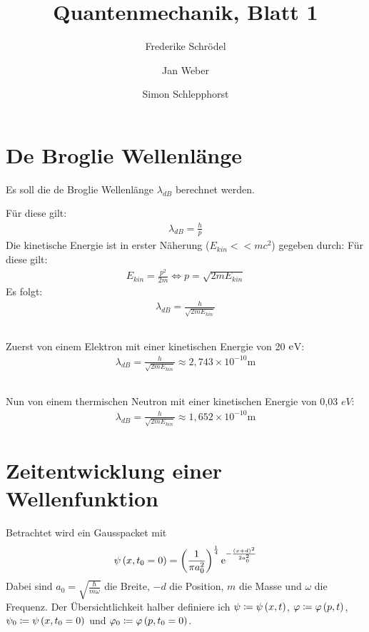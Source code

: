 \documentclass[11pt, ngerman, fleqn, DIV=15, headinclude]{scrartcl}
\title{Quantenmechanik, Blatt 1}
\author{
    Frederike Schrödel \and Jan Weber \and Simon Schlepphorst
}
\begin{document}
\maketitle

\section{De Broglie Wellenlänge}

Es soll die de Broglie Wellenlänge $\lambda_{dB}$ berechnet werden.

Für diese gilt:
\begin{align*}
	\lambda_{dB}=\frac{h}{p}
\end{align*}
Die kinetische Energie ist in erster Näherung ($E_{kin}<<mc^2$) gegeben durch:
Für diese gilt:
\begin{align*}
	E_{kin}=\frac{p^2}{2m} \Leftrightarrow p=\sqrt{2mE_{kin}}
\end{align*}
Es folgt:
\begin{align*}
	\lambda_{dB}=\frac{h}{\sqrt{2mE_{kin}}}
\end{align*}

\subsection{}

Zuerst von einem Elektron mit einer kinetischen Energie von 20 $\mathrm e$V:
\begin{align*}
	\lambda_{dB}=\frac{h}{\sqrt{2mE_{kin}}}\approx2,743\times10^{-10}\text{m}
\end{align*}

\subsection{}

Nun von einem thermischen Neutron mit einer kinetischen Energie von 0,03 $eV$:
\begin{align*}
	\lambda_{dB}=\frac{h}{\sqrt{2mE_{kin}}}\approx1,652\times10^{-10}\text{m}
\end{align*}


\section{Zeitentwicklung einer Wellenfunktion}

Betrachtet wird ein Gausspacket mit
\begin{align*}
	\psi\left( x,t_0=0 \right)=\left( \frac1{\pi a_0^2} \right)^{\frac14}\mathrm e^{-\frac{\left( x+d \right)^2}{2a_0^2}}
\end{align*}
Dabei sind $a_0=\sqrt{\frac{\hbar}{m\omega}}$ die Breite, $-d$ die Position, $m$ die Masse und $\omega$ die Frequenz. Der Übersichtlichkeit halber definiere ich $\psi\coloneqq\psi\left( x,t \right)$, $\varphi\coloneqq\varphi\left( p,t \right)$, $\psi_0\coloneqq\psi\left( x,t_0=0 \right)$ und $\varphi_0\coloneqq\varphi\left( p,t_0=0 \right)$.
\end{document}
